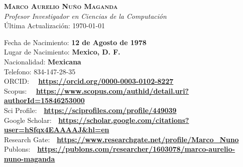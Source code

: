 \documentclass[letterpaper,10pt]{article}
\begin{document}
\begin{center}
    \textbf{\Large \scshape Marco Aurelio Nuño Maganda} \\ \vspace{1pt}
    \textit{Profesor Investigador en Ciencias de la Computación} \\
    Última Actualización: \today \\
\end{center}

\begin{minipage}{0.98 \textwidth} %
Fecha de Nacimiento: \textbf{12 de Agosto de 1978} \\
Lugar de Nacimiento: \textbf{Mexico, D. F.}\\
Nacionalidad: \textbf{Mexicana}\\
Telefono: 834-147-28-35  \\
ORCID: \ \ \textbf{\url{https://orcid.org/0000-0003-0102-8227}} \\
Scopus: \ \ \textbf{\url{https://www.scopus.com/authid/detail.uri?authorId=15846253000}} \\
Sci Profile:\ \ \textbf{\url{https://sciprofiles.com/profile/449039}} \\
Google Scholar:\ \ \textbf{\url{https://scholar.google.com/citations?user=hSfqx4EAAAAJ&hl=en}}\\
Research Gate:\ \ \textbf{\url{https://www.researchgate.net/profile/Marco_Nuno}}\\
Publons:\ \  \textbf{\url{https://publons.com/researcher/1603078/marco-aurelio-nuno-maganda}}\\
\end{minipage}
\end{document}
